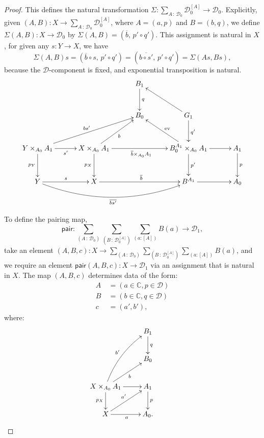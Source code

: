 \documentclass[12pt]{article}
\newcommand{\cors}[1]{\ensuremath{[#1]}}
\newcommand{\C}{\ensuremath{\mathbb{C}}}
\newcommand{\D}{\ensuremath{\mathcal{D}}}
\newcommand{\ty}{\ensuremath{\,:\,}}
\newcommand{\pairmap}{\ensuremath{\mathsf{pair}}}
\theoremstyle{definition}
\begin{document}
\begin{proof}
This defines the natural transformation $\Sigma : \sum_{A\ty\D_0}\D_0^{\cors{A}} \to \D_0$.  
Explicitly, given $(A, B): X \to \sum_{A\ty\D_0}\D_0^{\cors{A}}$, where  $A = (a, p)$ and $B = (b, q)$, we define $\Sigma(A,B) : X\to \D_0$ by $\Sigma(A,B) = (\overline{b},\, p'\circ q')$.  This assignment is natural in $X$, for given any $s: Y\to X$, we have 
$$\Sigma(A,B)s = (\overline{b}\circ s,\, p'\circ q') = (\overline{b\circ s'},\, p'\circ q') = \Sigma(As,Bs),$$
because the \D-component is fixed, and exponential transposition is natural.
\[
\xymatrix@=3em{
&& B_1 \ar[d] ^{q} & &\\
&&B_0 & \ar[lu] G_1 \ar[d]^{q'} & \\
Y\times_{A_0} A_1\ar[rru]^{bs'} \ar[d]_{p_Y}  \ar[r]_{s'} & X\times_{A_0} A_1\ar[ru]_{b} \ar[d]_{p_X}  \ar[rr]_{\overline{b}\times_{A_0}A_1} && \ar[lu]_{\mathrm{ev}} B_{0}^{A_1} \times_{A_0} A_1 \ar[d]^{p'} \ar[r] & A_1 \ar[d]^{p}\\
Y \ar[r]^{s} \ar@/_5ex /[rrr]_{\overline{bs'}} & X \ar[rr]^{\overline{b}} && B^{A_1} \ar[r]  & A_0}
\]

To define the pairing map,
\[
\pairmap : \sum_{(A\ty\D_0)}\sum_{(B\ty\D_0^{\cors{A}})}\sum_{(a : \cors{A})}B(a) \to \D_1,
\]
take an element $(A,B,c): X\to \sum_{(A\ty\D_0)}\sum_{(B\ty\D_0^{\cors{A}})}\sum_{(a : \cors{A})}B(a)$, and we require an element  $\pairmap (A,B,c) : X\to \D_1$ via an assignment that is natural in $X$.  The map $(A,B,c)$ determines data of the form:
\begin{align*}
A\ &= (a\in\C, p\in\D) \\
B\ &= (b\in\C, q\in\D)\\
c &= (a',b'),
\end{align*}
where:
%
\begin{equation*}%
\xymatrix{
& B_1 \ar[d]^{q} &\\
& B_0 &\\
X\times_{A_0} A_1 \ar@/^2ex /[ruu]^{b'} \ar[ru]_-{b} \ar[d]_{p_X} \ar[r] & A_1 \ar[d]^{p}\\
X \ar[r]_{a} \ar[ru]^{a'} & A_0.}
\end{equation*}


\end{proof}
\end{document}

